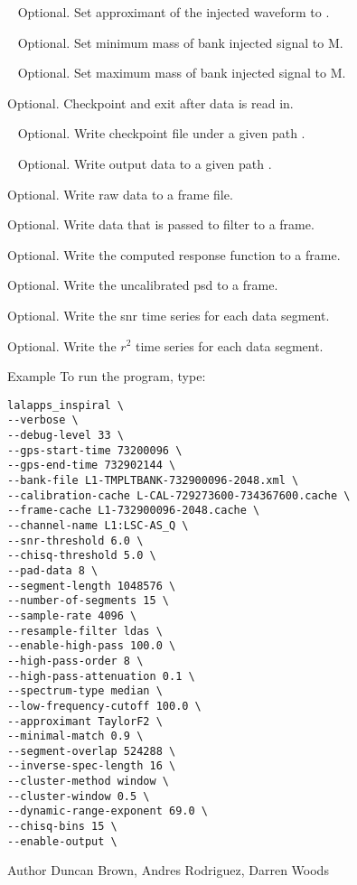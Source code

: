 \begin{entry}
\begin{entry}
\item[\option{--sim-approximant}~\parm{APX}] Optional. Set approximant 
of the injected waveform to .

\item[\option{--sim-minimum-mass}~\parm{M}] Optional. Set minimum mass of 
bank injected signal to {M}.

\item[\option{--sim-maximum-mass}~\parm{M}] Optional. Set maximum mass of 
bank injected signal to {M}.

\item[\option{--data-checkpoint}] Optional. Checkpoint and exit after data 
is read in.

\item[\option{--checkpoint-path}~\parm{PATH}] Optional. Write checkpoint 
file under a given path .

\item[\option{--output-path}~\parm{PATH}] Optional. Write output data to 
a given path .

\item[\option{--write-raw-data}] Optional. Write raw data to a frame file.

\item[\option{--write-filter-data}] Optional. Write data that is passed to 
filter to a frame.

\item[\option{--write-response}] Optional. Write the computed response 
function to a frame.

\item[\option{--write-spectrum}] Optional. Write the uncalibrated psd to a 
frame.

\item[\option{--write-snrsq}] Optional. Write the snr time series for each 
data segment.

\item[\option{--write-chisq}] Optional. Write the $r^2$ time series for each 
data segment.


\end{entry}

\item[Example]
To run the program, type:
\begin{verbatim}
lalapps_inspiral \
--verbose \
--debug-level 33 \ 
--gps-start-time 73200096 \
--gps-end-time 732902144 \
--bank-file L1-TMPLTBANK-732900096-2048.xml \
--calibration-cache L-CAL-729273600-734367600.cache \ 
--frame-cache L1-732900096-2048.cache \
--channel-name L1:LSC-AS_Q \
--snr-threshold 6.0 \
--chisq-threshold 5.0 \
--pad-data 8 \
--segment-length 1048576 \
--number-of-segments 15 \
--sample-rate 4096 \
--resample-filter ldas \
--enable-high-pass 100.0 \ 
--high-pass-order 8 \
--high-pass-attenuation 0.1 \ 
--spectrum-type median \
--low-frequency-cutoff 100.0 \ 
--approximant TaylorF2 \
--minimal-match 0.9 \
--segment-overlap 524288 \
--inverse-spec-length 16 \
--cluster-method window \
--cluster-window 0.5 \
--dynamic-range-exponent 69.0 \ 
--chisq-bins 15 \
--enable-output \
\end{verbatim} 





\item[Author] Duncan Brown, Andres Rodriguez, Darren Woods 
\end{entry}
